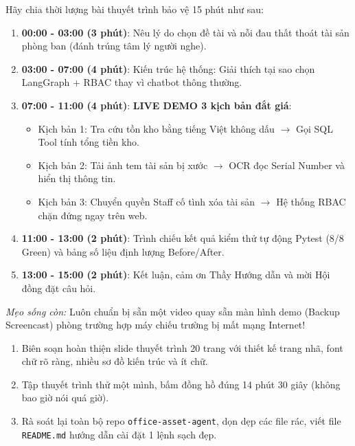 \begin{codeautopsybox}
Hãy chia thời lượng bài thuyết trình bảo vệ 15 phút như sau:
\begin{enumerate}[leftmargin=1.5em]
    \item \textbf{00:00 - 03:00 (3 phút)}: Nêu lý do chọn đề tài và nỗi đau thất thoát tài sản phòng ban (đánh trúng tâm lý người nghe).
    \item \textbf{03:00 - 07:00 (4 phút)}: Kiến trúc hệ thống: Giải thích tại sao chọn LangGraph + RBAC thay vì chatbot thông thường.
    \item \textbf{07:00 - 11:00 (4 phút)}: \textbf{LIVE DEMO 3 kịch bản đắt giá}:
    \begin{itemize}
        \item Kịch bản 1: Tra cứu tồn kho bằng tiếng Việt không dấu $\rightarrow$ Gọi SQL Tool tính tổng tiền kho.
        \item Kịch bản 2: Tải ảnh tem tài sản bị xước $\rightarrow$ OCR đọc Serial Number và hiển thị thông tin.
        \item Kịch bản 3: Chuyển quyền Staff cố tình xóa tài sản $\rightarrow$ Hệ thống RBAC chặn đứng ngay trên web.
    \end{itemize}
    \item \textbf{11:00 - 13:00 (2 phút)}: Trình chiếu kết quả kiểm thử tự động Pytest (8/8 Green) và bảng số liệu định lượng Before/After.
    \item \textbf{13:00 - 15:00 (2 phút)}: Kết luận, cảm ơn Thầy Hướng dẫn và mời Hội đồng đặt câu hỏi.
\end{enumerate}
\textit{Mẹo sống còn:} Luôn chuẩn bị sẵn một video quay sẵn màn hình demo (Backup Screencast) phòng trường hợp máy chiếu trường bị mất mạng Internet!
\end{codeautopsybox}

\begin{labmilestonebox}
\begin{enumerate}[leftmargin=1.5em]
    \item Biên soạn hoàn thiện slide thuyết trình 20 trang với thiết kế trang nhã, font chữ rõ ràng, nhiều sơ đồ kiến trúc và ít chữ.
    \item Tập thuyết trình thử một mình, bấm đồng hồ đúng 14 phút 30 giây (không bao giờ nói quá giờ).
    \item Rà soát lại toàn bộ repo \texttt{office-asset-agent}, dọn dẹp các file rác, viết file \texttt{README.md} hướng dẫn cài đặt 1 lệnh sạch đẹp.
\end{enumerate}
\end{labmilestonebox}

